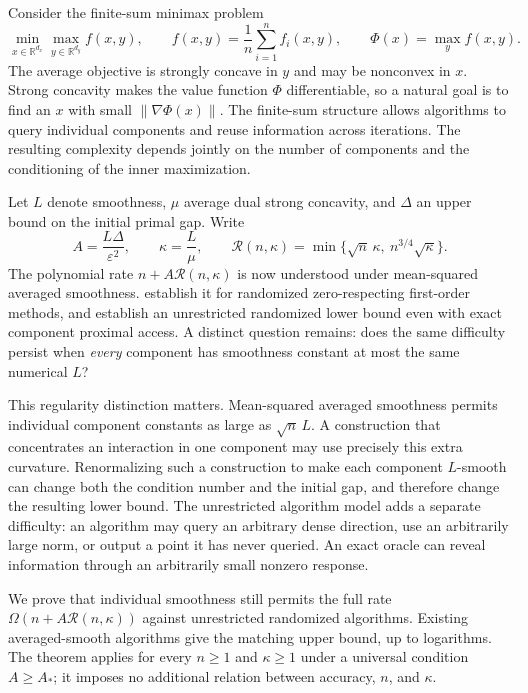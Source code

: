\documentclass[11pt,letterpaper]{article}
\theoremstyle{definition}
\theoremstyle{remark}
\newcommand{\R}{\mathbb R}
\newcommand{\cR}{\mathcal R}
\begin{document}
Consider the finite-sum minimax problem
\begin{equation}
 \min_{x\in\R^{d_x}}\max_{y\in\R^{d_y}} f(x,y),
 \qquad f(x,y)=\frac1n\sum_{i=1}^n f_i(x,y),
 \qquad \Phi(x)=\max_y f(x,y).
 \label{eq:problem}
\end{equation}
The average objective is strongly concave in $y$ and may be nonconvex in $x$.
Strong concavity makes the value function $\Phi$ differentiable, so a natural
goal is to find an $x$ with small $\|\nabla\Phi(x)\|$. The finite-sum structure
allows algorithms to query individual components and reuse information
across iterations. The resulting complexity depends jointly on the number
of components and the conditioning of the inner maximization.

Let $L$ denote smoothness, $\mu$ average dual strong concavity, and $\Delta$
an upper bound on the initial primal gap. Write
\begin{equation}
 A=\frac{L\Delta}{\varepsilon^2},\qquad
 \kappa=\frac L\mu,\qquad
 \cR(n,\kappa)=\min\{\sqrt n\,\kappa,\ n^{3/4}\sqrt\kappa\}.
 \label{eq:rate-notation}
\end{equation}
The polynomial rate $n+A\cR(n,\kappa)$ is now understood under
mean-squared averaged smoothness. \citet{zhou2026} establish it for randomized
zero-respecting first-order methods, and \citet{pengprox2026} establish an
unrestricted randomized lower bound even with exact component proximal
access. A distinct question remains: does the same difficulty persist when
\emph{every} component has smoothness constant at most the same numerical $L$?

This regularity distinction matters. Mean-squared averaged smoothness permits
individual component constants as large as $\sqrt n\,L$. A construction
that concentrates an interaction in one component may use precisely this
extra curvature. Renormalizing such a construction to make each component
$L$-smooth can change both the condition number and the initial gap, and
therefore change the resulting lower bound. The unrestricted algorithm model
adds a separate difficulty: an algorithm may query an arbitrary dense
direction, use an arbitrarily large norm, or output a point it has never
queried. An exact oracle can reveal information through an arbitrarily small
nonzero response.

We prove that individual smoothness still permits the full rate
$\Omega(n+A\cR(n,\kappa))$ against unrestricted randomized algorithms.
Existing averaged-smooth algorithms give the matching upper bound, up to
logarithms. The theorem applies for every $n\ge1$ and $\kappa\ge1$ under
a universal condition $A\ge A_*$; it imposes no additional relation between
accuracy, $n$, and $\kappa$.
\end{document}
